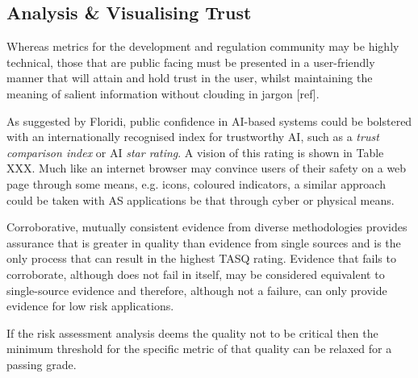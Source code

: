 \subsection{Analysis \& Visualising Trust}

Whereas metrics for the development and regulation community may be highly technical, those that are public facing must be presented in a user-friendly manner that will attain and hold trust in the user, whilst maintaining the meaning of salient information without clouding in jargon [ref]. 

As suggested by Floridi, public confidence in AI-based systems could be bolstered with an internationally recognised index for trustworthy AI, such as a \emph{trust comparison index} or AI \emph{star rating}. A vision of this rating is shown in Table XXX. Much like an internet browser may convince users of their safety on a web page through some means, e.g. icons, coloured indicators, a similar approach could be taken with AS applications be that through cyber or physical means.


Corroborative, mutually consistent evidence from diverse methodologies provides assurance that is greater in quality than evidence from single sources and is the only process that can result in the highest TASQ rating. Evidence that fails to corroborate, although does not fail in itself, may be considered equivalent to single-source evidence and therefore, although not a failure, can only provide evidence for low risk applications.


If the risk assessment analysis deems the quality not to be critical then the minimum threshold for the specific metric of that quality can be relaxed for a passing grade. 

